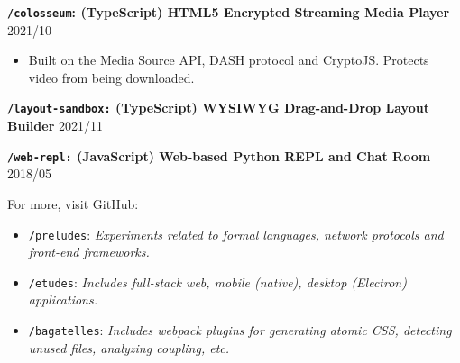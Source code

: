 \documentclass[10pt]{article}
\begin{document}
\vspace{0.5em}
\textbf{\texttt{/colosseum}:  (TypeScript) HTML5 Encrypted Streaming Media Player}   \hfill 2021/10
\begin{itemize}
\item Built on the Media Source API, DASH protocol and CryptoJS. Protects video from being downloaded.
\end{itemize}

\vspace{0.5em}
\textbf{\texttt{/layout-sandbox:} (TypeScript) WYSIWYG Drag-and-Drop Layout Builder} \hfill 2021/11

\vspace{0.5em}
\textbf{\texttt{/web-repl:} (JavaScript) Web-based Python REPL and Chat Room}  \hfill 2018/05 


\vspace{2em}
For more, visit GitHub: 
\begin{itemize}
\item \texttt{/preludes}: \textit{Experiments related to formal languages, network protocols and front-end frameworks.}
\item \texttt{/etudes}: \textit{Includes full-stack web, mobile \textup(native\textup), desktop \textup(Electron\textup) applications.}
\item \texttt{/bagatelles}: \textit{Includes webpack plugins for generating atomic CSS, detecting unused files, analyzing coupling, etc.}
\end{itemize}
\end{document}
